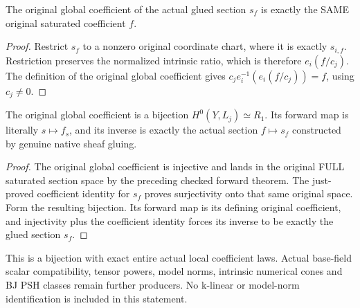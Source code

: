 \begin{theorem}
\label{thm:seven-native-original-global-section-coefficient-inverse}
\leanok
The original global coefficient of the actual glued section $s_f$ is
exactly the SAME original saturated coefficient $f$.
\end{theorem}
\begin{proof}
Restrict $s_f$ to a nonzero original coordinate chart, where it is exactly
$s_{i,f}$. Restriction preserves the normalized intrinsic ratio, which
is therefore $e_i(f/c_j)$. The definition of the original global coefficient
gives $c_j e_i^{-1}(e_i(f/c_j))=f$, using $c_j\ne0$.
\end{proof}

\begin{theorem}
\label{thm:seven-native-original-full-H0}
\leanok
The original global coefficient is a bijection
$H^0(Y,L_j)\simeq R_1$. Its forward map is literally $s\mapsto f_s$,
and its inverse is exactly the actual section $f\mapsto s_f$ constructed
by genuine native sheaf gluing.
\end{theorem}
\begin{proof}
The original global coefficient is injective and lands in the original
FULL saturated section space by the preceding checked forward theorem.
The just-proved coefficient identity for $s_f$ proves surjectivity onto
that same original space. Form the resulting bijection. Its forward map
is its defining original coefficient, and injectivity plus the coefficient
identity forces its inverse to be exactly the glued section $s_f$.
\end{proof}

\begin{remark}
This is a bijection with exact entire actual local coefficient laws.
Actual base-field scalar compatibility, tensor powers, model norms,
intrinsic numerical cones and BJ PSH classes remain further producers.
No k-linear or model-norm identification is included in this statement.
\end{remark}

